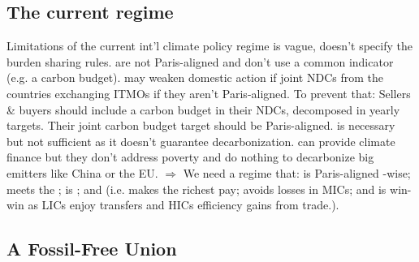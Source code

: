 \documentclass[aspectratio=169,xcolor=dvipsnames, 11pt,mathserif]{beamer}
\begin{document}


\subsection{The current regime}


\begin{frame}{Limitations of the current int'l climate policy regime}
    \bbsp \ip {} is vague, doesn't specify the burden sharing rules.
    \ip {} are not Paris-aligned and don't use a common indicator (e.g. a carbon budget).
    \ip {} may weaken domestic action if joint NDCs from the countries exchanging ITMOs if they aren't Paris-aligned. To prevent that:
    \bbsp \ip Sellers \& buyers should include a carbon budget in their NDCs, decomposed in yearly targets.
    \ip Their joint carbon budget target should be Paris-aligned. \ee
    \ip {} is necessary but not sufficient as it doesn't guarantee decarbonization.
    \ip {} can provide climate finance but they don't address poverty and do nothing to decarbonize big emitters like China or the EU.
    \ip $\Rightarrow$ We need a regime that: is Paris-aligned -wise; meets the ; is ; and  (i.e.  makes the richest pay; avoids losses in MICs; and is win-win as LICs enjoy transfers and HICs efficiency gains from trade.).
    \ee
\end{frame}


\subsection{A Fossil-Free Union}
\end{document}
